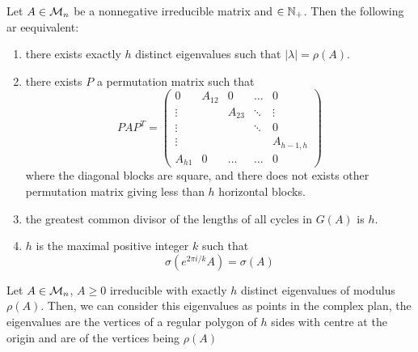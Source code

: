 \documentclass[aspectratio=169]{beamer}
\begin{document}
\begin{frame}
\begin{theorem}
Let $A\in \mathcal{M}_n$ be a nonnegative irreducible matrix and $\in \mathbb{N}_{+}$. Then the following ar eequivalent:
\begin{enumerate}
    \item there exists exactly $h$ distinct eigenvalues such that $|\lambda| = \rho(A)$.
    \item there exists $P$ a permutation matrix such that 
    \[PAP^{T}= \begin{pmatrix}
    0& A_{12}&0 & \dots & 0\\
    \vdots& & A_{23}& \ddots&\vdots \\
    \vdots&& &\ddots&0 \\
    \vdots&& && A_{h-1,h}\\
    A_{h1} &0&\ldots& \ldots & 0
    \end{pmatrix}\]
    where the diagonal blocks are square, and there does not exists other permutation matrix giving less than $h$ horizontal blocks.
    \item the greatest common divisor of the lengths of all cycles in $G(A)$ is $h$.
    \item $h$ is the maximal positive integer $k$ such that 
    \[\sigma(e^{2\pi i /k}A)= \sigma(A)\]
\end{enumerate}
\end{theorem}
\end{frame}


\begin{frame}
\begin{corollary}
Let $A\in \mathcal{M}_n$, $A\geq 0$ irreducible with exactly $h$ distinct eigenvalues of modulus $\rho(A)$. Then, we can consider this eigenvalues as points in the complex plan, the eigenvalues are the vertices of a regular polygon of $h$ sides with centre at the origin and are of the vertices being $\rho(A)$

\end{corollary}
\end{frame}
\end{document}
